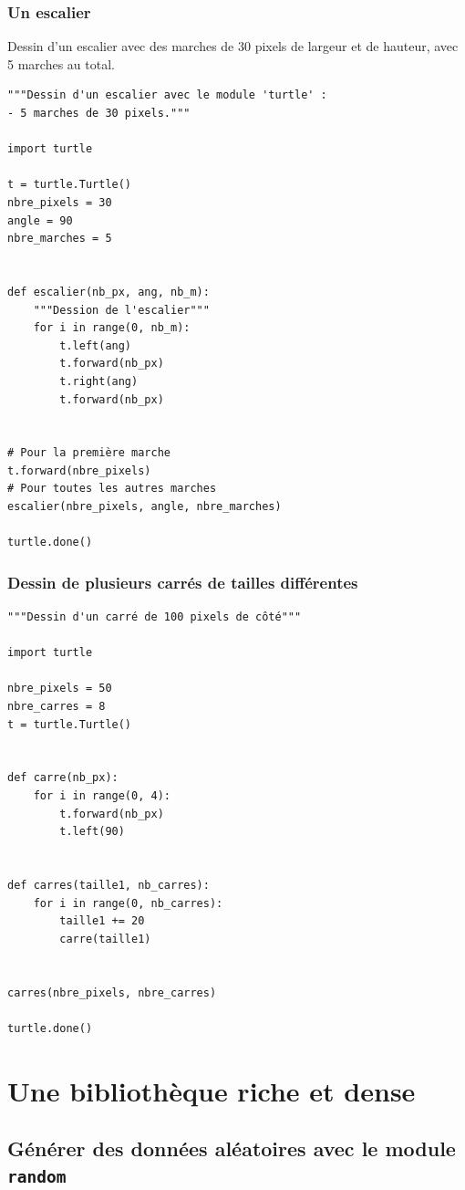 \documentclass[a4paper,11pt]{book}
\begin{document}
\section{Un escalier}
Dessin d'un escalier avec des marches de 30 pixels de largeur et de hauteur, avec 5 marches au total.
\begin{lstlisting}
"""Dessin d'un escalier avec le module 'turtle' :
- 5 marches de 30 pixels."""

import turtle

t = turtle.Turtle()
nbre_pixels = 30
angle = 90
nbre_marches = 5


def escalier(nb_px, ang, nb_m):
    """Dession de l'escalier"""
    for i in range(0, nb_m):
        t.left(ang)
        t.forward(nb_px)
        t.right(ang)
        t.forward(nb_px)


# Pour la première marche
t.forward(nbre_pixels)
# Pour toutes les autres marches
escalier(nbre_pixels, angle, nbre_marches)

turtle.done()
\end{lstlisting}
\medskip

\section{Dessin de plusieurs carrés de tailles différentes}
\begin{lstlisting}
"""Dessin d'un carré de 100 pixels de côté"""

import turtle

nbre_pixels = 50
nbre_carres = 8
t = turtle.Turtle()


def carre(nb_px):
    for i in range(0, 4):
        t.forward(nb_px)
        t.left(90)


def carres(taille1, nb_carres):
    for i in range(0, nb_carres):
        taille1 += 20
        carre(taille1)


carres(nbre_pixels, nbre_carres)

turtle.done()
\end{lstlisting}
\medskip

\part{Une bibliothèque riche et dense}
\chapter{Générer des données aléatoires avec le module \texttt{random}}
\end{document}
